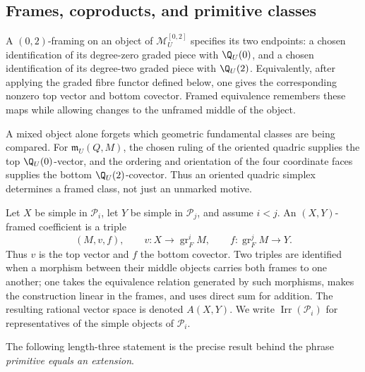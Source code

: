 \subsection{Frames, coproducts, and primitive classes}
\label{cp:subsec-frames-coproduct}

\begin{definition}
\label{cp:def-framed}
A \((0,2)\)-framing on an object of \(\mathcal M_U^{[0,2]}\) specifies its
two endpoints: a chosen identification of its degree-zero graded piece with
\(\Q_U(0)\), and a chosen identification of its degree-two graded piece with
\(\Q_U(2)\).  Equivalently, after applying the graded fibre functor defined
below, one gives the corresponding nonzero top vector and bottom covector.
Framed equivalence remembers these maps while
allowing changes to the unframed middle of the object.
\end{definition}

A mixed object alone forgets which geometric fundamental classes are being
compared.  For \(\mathfrak m_U(Q,M)\), the chosen ruling of the oriented
quadric supplies the top \(\Q_U(0)\)-vector, and the ordering and
orientation of the four coordinate faces supplies the bottom
\(\Q_U(2)\)-covector.  Thus an oriented quadric simplex
determines a framed class, not just an unmarked motive.

\begin{definition}
\label{cp:def-coefficient-space}
Let \(X\) be simple in \(\mathcal P_i\), let \(Y\) be simple in
\(\mathcal P_j\), and assume \(i<j\).  An \((X,Y)\)-framed coefficient is
a triple
\[
 (M,v,f),\qquad
 v:X\longrightarrow\operatorname{gr}_F^iM,\qquad
 f:\operatorname{gr}_F^jM\longrightarrow Y.
\]
Thus \(v\) is the top vector and \(f\) the bottom covector.  Two triples are
identified when a morphism between their middle objects carries both
frames to one another; one takes the equivalence relation generated by such
morphisms, makes the construction linear in the frames, and uses direct sum
for addition.  The resulting rational vector space is denoted \(A(X,Y)\).
We write \(\operatorname{Irr}(\mathcal P_i)\) for representatives of the
simple objects of \(\mathcal P_i\).
\end{definition}

The following length-three statement is the precise result behind the
phrase \emph{primitive equals an extension}.


